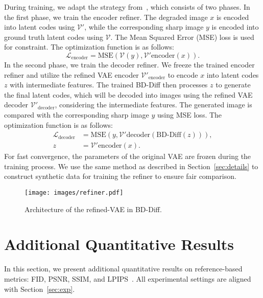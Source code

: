 During training, we adapt the strategy from~\cite{chen2025unirestore}, which consists of two phases. In the first phase, we train the encoder refiner. The degraded image $x$ is encoded into latent codes using $\mathcal{V'}$, while the corresponding sharp image $y$ is encoded into ground truth latent codes using $\mathcal{V}$. The Mean Squared Error (MSE) loss is used for constraint. The optimization function is as follows:
\begin{equation}
\mathcal{L}_{\text{encoder}} = \text{MSE}(\mathcal{V}(y), \mathcal{V'}{\text{encoder}}(x)).
\end{equation}
In the second phase, we train the decoder refiner. We freeze the trained encoder refiner and utilize the refined VAE encoder $\mathcal{V'}_{\text{encoder}}$ to encode $x$ into latent codes $z$ with intermediate features. The trained BD-Diff then processes $z$ to generate the final latent codes, which will be decoded into images using the refined VAE decoder $\mathcal{V'}_{\text{decoder}}$, considering the intermediate features. The generated image is compared with the corresponding sharp image $y$ using MSE loss. The optimization function is as follows:
\begin{equation}
\begin{aligned}
\mathcal{L}_{\text{decoder}} &= \text{MSE}(y, \mathcal{V'}{\text{decoder}}(\text{BD-Diff}(z))), \\
z &= \mathcal{V'}{\text{encoder}}(x).
\end{aligned}
\end{equation}
For fast convergence, the parameters of the original VAE are frozen during the training process. We use the same method as described in Section~\ref{sec:details} to construct synthetic data for training the refiner to ensure fair comparison.


\begin{figure}[!t]
	\centering
	\texttt{[image: images/refiner.pdf]}
	\caption{Architecture of the refined-VAE in BD-Diff.}
	\label{fig:refiner}
\end{figure}

\section{Additional Quantitative Results}
\label{appendix: additional metrics}
In this section, we present additional quantitative results on reference-based metrics: FID, PSNR, SSIM, and LPIPS~\cite{zhang2018unreasonable}. All experimental settings are aligned with Section~\ref{sec:exp}.

